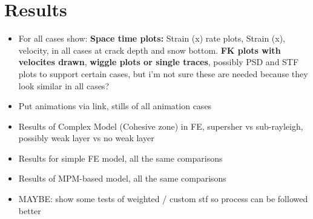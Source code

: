 \documentclass[10pt]{article}
\begin{document}


\section{Results}
\begin{itemize}
  \item For all cases show: \textbf{Space time plots:} Strain (x) rate plots, Strain (x), velocity, in all cases at crack depth and snow bottom. \textbf{FK plots with velocites drawn}, \textbf{wiggle plots or single traces}, possibly PSD and STF plots to support certain cases, but i'm not sure these are needed because they look similar in all cases? 
  \item Put animations via link, stills of all animation cases 
  \item Results of Complex Model (Cohesive zone) in FE, supersher vs sub-rayleigh, possibly weak layer vs no weak layer
  \item Results for simple FE model, all the same comparisons
  \item Results of MPM-based model, all the same comparisons
  \item MAYBE: show some tests of weighted / custom stf so process can be followed better
\end{itemize}
\end{document}

